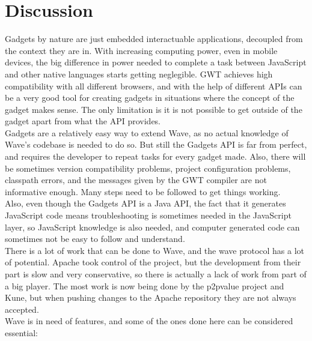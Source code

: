 \newpage
\section{Discussion}

Gadgets by nature are just embedded interactuable applications, decoupled from the context they are in. With increasing computing power, even in mobile devices, the big difference \cite{ref:javascript_slow} in power needed to complete a task between JavaScript and other native languages starts getting neglegible. GWT achieves high compatibility with all different browsers, and with the help of different APIs can be a very good tool for creating gadgets in situations where the concept of the gadget makes sense. The only limitation is it is not possible to get outside of the gadget apart from what the API provides.\\[.2cm]
Gadgets are a relatively easy way to extend Wave, as no actual knowledge of Wave's codebase is needed to do so. But still the Gadgets API is far from perfect, and requires the developer to repeat tasks for every gadget made. Also, there will be sometimes version compatibility problems, project configuration problems, classpath errors, and the messages given by the GWT compiler are not informative enough. Many steps need to be followed to get things working.\\[.2cm]
Also, even though the Gadgets API is a Java API, the fact that it generates JavaScript code means troubleshooting is sometimes needed in the JavaScript layer, so JavaScript knowledge is also needed, and computer generated code can sometimes not be easy to follow and understand.\\[.2cm]
There is a lot of work that can be done to Wave, and the wave protocol has a lot of potential. Apache took control of the project, but the development from their part is slow and very conservative, so there is actually a lack of work from part of a big player. The most work is now being done by the p2pvalue project and Kune, but when pushing changes to the Apache repository they are not always accepted.\\[.2cm]
Wave is in need of features, and some of the ones done here can be considered essential:
